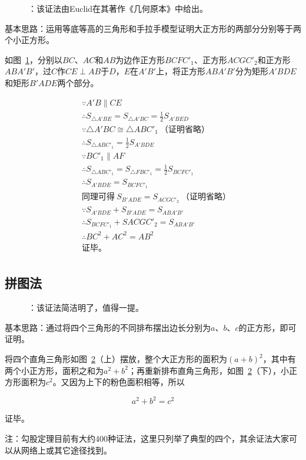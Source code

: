 \begin{figure}[htbp]
  \centering
  \caption{：该证法由Euclid在其著作《几何原本》中给出。}
  \label{fig:0006-eu}
\end{figure}

基本思路：运用等底等高的三角形和手拉手模型证明大正方形的两部分分别等于两个小正方形。

如图~\ref{fig:0006-eu}，分别以$BC$、$AC$和$AB$为边作正方形$BCFC'_1$、正方形$ACGC'_2$和正方形$ABA'B'$，过$C$作$CE \perp AB$于$D$，$E$在$A'B'$上，将正方形$ABA'B'$分为矩形$A'BDE$和矩形$B'ADE$两个部分。

\begin{align*}
  &\because   A'B \parallel CE \\
  &\therefore S_{\triangle A'BE} = S_{\triangle A'BC} = \frac12S_{A'BED} \\
  &\because   \triangle A'BC \cong \triangle ABC'_1 \ \text{（证明省略）} \\
  &\therefore S_{\triangle ABC'_1} = \frac12S_{A'BDE} \\
  &\because   BC'_1 \parallel AF \\
  &\therefore S_{\triangle ABC'_1} = S_{\triangle FBC'_1} = \frac12S_{BCFC'_1} \\
  &\therefore S_{A'BDE} = S_{BCFC'_1} \\
  &\text{同理可得}\ S_{B'ADE} = S_{ACGC'_2} \ \text{（证明省略）} \\
  &\because   S_{A'BDE} + S_{B'ADE} = S_{ABA'B'} \\
  &\therefore S_{BCFC'_1} + S{ACGC'_2} = S_{ABA'B'} \\
  &\therefore BC^2 + AC^2 = AB^2 \\
  &\text{证毕。} \\
\end{align*}

\subsection{拼图法} \label{subsec:0006-puz}

\begin{figure}[htbp]
  \centering
  \caption{：该证法简洁明了，值得一提。} \label{fig:0006-puz}
\end{figure}

基本思路：通过将四个三角形的不同排布摆出边长分别为$a$、$b$、$c$的正方形，即可证明。

将四个直角三角形如图~\ref{fig:0006-puz}（上）摆放，整个大正方形的面积为$(a + b)^2$，其中有两个小正方形，面积之和为$a^2 + b^2$；再重新排布直角三角形，如图~\ref{fig:0006-puz}（下），小正方形面积为$c^2$。又因为上下的粉色面积相等，所以

\[ a^2 + b^2 = c^2 \]

证毕。

\vspace{15pt}
注：勾股定理目前有大约400种证法，这里只列举了典型的四个，其余证法大家可以从网络上或其它途径找到。
